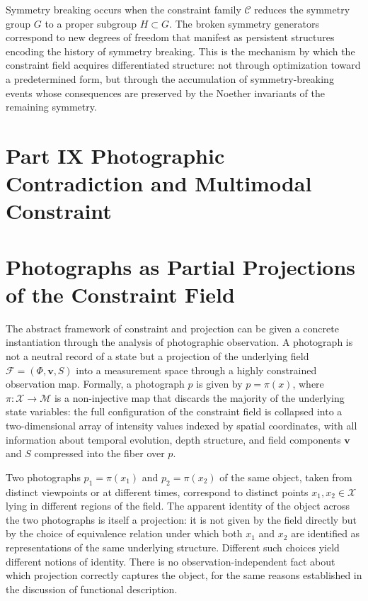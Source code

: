 \documentclass[12pt, a4paper, oneside]{article}
\theoremstyle{plain}
\theoremstyle{definition}
\theoremstyle{remark}
\newcommand{\X}{\mathcal{X}}
\newcommand{\C}{\mathcal{C}}
\newcommand{\M}{\mathcal{M}}
\newcommand{\proj}{\pi}
\begin{document}
Symmetry breaking occurs when the constraint family $\C$ reduces the symmetry group $G$ to a proper subgroup $H \subset G$. The broken symmetry generators correspond to new degrees of freedom that manifest as persistent structures encoding the history of symmetry breaking. This is the mechanism by which the constraint field acquires differentiated structure: not through optimization toward a predetermined form, but through the accumulation of symmetry-breaking events whose consequences are preserved by the Noether invariants of the remaining symmetry.

\section*{Part IX \quad Photographic Contradiction and Multimodal Constraint}

\setcounter{section}{43}

\section{Photographs as Partial Projections of the Constraint Field}

The abstract framework of constraint and projection can be given a concrete instantiation through the analysis of photographic observation. A photograph is not a neutral record of a state but a projection of the underlying field $\mathcal{F} = (\Phi, \mathbf{v}, S)$ into a measurement space through a highly constrained observation map. Formally, a photograph $p$ is given by $p = \proj(x)$, where $\proj : \X \to \M$ is a non-injective map that discards the majority of the underlying state variables: the full configuration of the constraint field is collapsed into a two-dimensional array of intensity values indexed by spatial coordinates, with all information about temporal evolution, depth structure, and field components $\mathbf{v}$ and $S$ compressed into the fiber over $p$.

Two photographs $p_1 = \proj(x_1)$ and $p_2 = \proj(x_2)$ of the same object, taken from distinct viewpoints or at different times, correspond to distinct points $x_1, x_2 \in \X$ lying in different regions of the field. The apparent identity of the object across the two photographs is itself a projection: it is not given by the field directly but by the choice of equivalence relation under which both $x_1$ and $x_2$ are identified as representations of the same underlying structure. Different such choices yield different notions of identity. There is no observation-independent fact about which projection correctly captures the object, for the same reasons established in the discussion of functional description.
\end{document}
